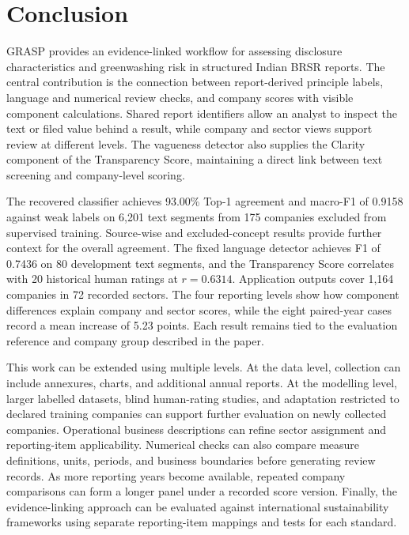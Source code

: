 \section{Conclusion}
\label{sec:conclusion}

GRASP provides an evidence-linked workflow for assessing disclosure characteristics and greenwashing risk in structured Indian BRSR reports. The central contribution is the connection between report-derived principle labels, language and numerical review checks, and company scores with visible component calculations. Shared report identifiers allow an analyst to inspect the text or filed value behind a result, while company and sector views support review at different levels. The vagueness detector also supplies the Clarity component of the Transparency Score, maintaining a direct link between text screening and company-level scoring.

The recovered classifier achieves 93.00\% Top-1 agreement and macro-F1 of 0.9158 against weak labels on 6,201 text segments from 175 companies excluded from supervised training. Source-wise and excluded-concept results provide further context for the overall agreement. The fixed language detector achieves F1 of 0.7436 on 80 development text segments, and the Transparency Score correlates with 20 historical human ratings at $r=0.6314$. Application outputs cover 1,164 companies in 72 recorded sectors. The four reporting levels show how component differences explain company and sector scores, while the eight paired-year cases record a mean increase of 5.23 points. Each result remains tied to the evaluation reference and company group described in the paper.

This work can be extended using multiple levels. At the data level, collection can include annexures, charts, and additional annual reports. At the modelling level, larger labelled datasets, blind human-rating studies, and adaptation restricted to declared training companies can support further evaluation on newly collected companies. Operational business descriptions can refine sector assignment and reporting-item applicability. Numerical checks can also compare measure definitions, units, periods, and business boundaries before generating review records. As more reporting years become available, repeated company comparisons can form a longer panel under a recorded score version. Finally, the evidence-linking approach can be evaluated against international sustainability frameworks using separate reporting-item mappings and tests for each standard.
